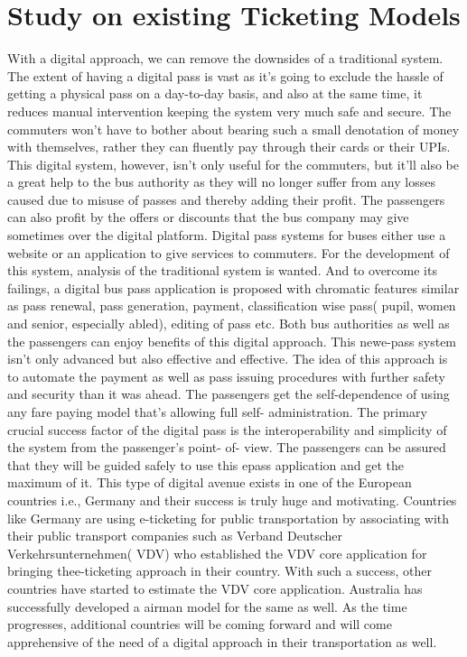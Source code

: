 \section{Study on existing Ticketing Models}
With a digital approach, we can remove the downsides of a traditional system. The extent of having a digital pass is vast as it's going to exclude the hassle of getting a physical pass on a day-to-day basis, and also at the same time, it reduces manual intervention keeping the system very much safe and secure. The commuters won't have to bother about bearing such a small denotation of money with themselves, rather they can fluently pay through their cards or their UPIs. This digital system, however, isn't only useful for the commuters, but it'll also be a great help to the bus authority as they will no longer suffer from any losses caused due to misuse of passes and thereby adding their profit. The passengers can also profit by the offers or discounts that the bus company may give sometimes over the digital platform. Digital pass systems for buses either use a website or an application to give services to commuters. For the development of this system, analysis of the traditional system is wanted. And to overcome its failings, a digital bus pass application is proposed with chromatic features similar as pass renewal, pass generation, payment, classification wise pass( pupil, women and senior, especially abled), editing of pass etc. Both bus authorities as well as the passengers can enjoy benefits of this digital approach. This newe-pass system isn't only advanced but also effective and effective. The idea of this approach is to automate the payment as well as pass issuing procedures with further safety and security than it was ahead. The passengers get the self-dependence of using any fare paying model that's allowing full self- administration. The primary crucial success factor of the digital pass is the interoperability and simplicity of the system from the passenger’s point- of- view. The passengers can be assured that they will be guided safely to use this epass application and get the maximum of it. This type of digital avenue exists in one of the European countries i.e., Germany and their success is truly huge and motivating. Countries like Germany are using e-ticketing for public transportation by associating with their public transport companies such as Verband Deutscher Verkehrsunternehmen( VDV) who established the VDV core application for bringing thee-ticketing approach in their country. With such a success, other countries have started to estimate the VDV core application. Australia has successfully developed a airman model for the same as well. As the time progresses, additional countries will be coming forward and will come apprehensive of the need of a digital approach in their transportation as well.
